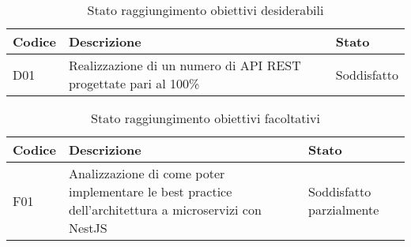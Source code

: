 \begin{table}[H]
    \begin{tabular}{|p{1.5cm}|p{7.7cm}|p{2cm}|} 
    \hline
    \textbf{Codice} & \textbf{Descrizione} & \textbf{Stato} \\ 
    \hline
    D01 & Realizzazione di un numero di \gls{API} \gls{REST} progettate pari al 100\%  & Soddisfatto \\
    \hline
    \end{tabular}
    \caption{Stato raggiungimento obiettivi desiderabili}
\end{table}
\begin{table}[H]
    \begin{tabular}{|p{1.5cm}|p{7.7cm}|p{2cm}|} 
    \hline
    \textbf{Codice} & \textbf{Descrizione} & \textbf{Stato} \\ 
    \hline
    F01 & Analizzazione di come poter implementare le best practice dell'architettura a microservizi con NestJS & Soddisfatto parzialmente \\
    \hline
    \end{tabular}
    \caption{Stato raggiungimento obiettivi facoltativi}
\end{table}

